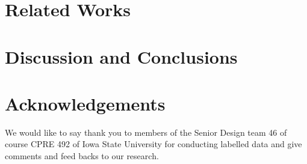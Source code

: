 \documentclass[sigconf,review]{acmart}
\begin{document}
\section{Related Works}

\section{Discussion and Conclusions}


\section*{Acknowledgements}
We would like to say thank you to members of the Senior Design team 46 of course CPRE 492 of Iowa State University for conducting labelled data and give comments and feed backs to our research.

\clearpage
{}

\end{document}
